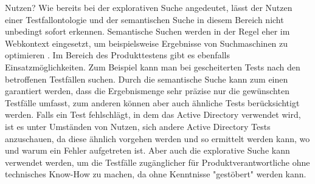 Nutzen?\newline
Wie bereits bei der explorativen Suche angedeutet, lässt der Nutzen einer Testfallontologie und der semantischen Suche in diesem Bereich nicht unbedingt sofort erkennen. Semantische Suchen werden in der Regel eher im Webkontext eingesetzt, um beispielsweise Ergebnisse von Suchmaschinen zu optimieren \cite{Sack.2010}.\newline
Im Bereich des Produkttestens gibt es ebenfalls Einsatzmöglichkeiten. Zum Beispiel kann man bei gescheiterten Tests nach den betroffenen Testfällen suchen. Durch die semantische Suche kann zum einen garantiert werden, dass die Ergebnismenge sehr präzise nur die gewünschten Testfälle umfasst, zum anderen können aber auch ähnliche Tests berücksichtigt werden. Falls ein Test fehlschlägt, in dem das Active Directory verwendet wird, ist es unter Umständen von Nutzen, sich andere Active Directory Tests anzuschauen, da diese ähnlich vorgehen werden und so ermittelt werden kann, wo und warum ein Fehler aufgetreten ist. Aber auch die explorative Suche kann verwendet werden, um die Testfälle zugänglicher für Produktverantwortliche ohne technisches Know-How zu machen, da ohne Kenntnisse "gestöbert" werden kann. 